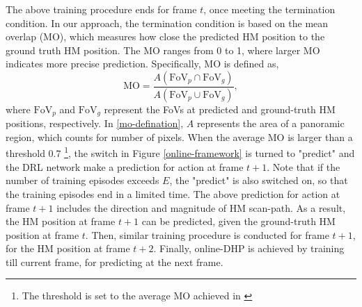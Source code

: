 \documentclass[10pt,journal,compsoc]{IEEEtran}
\begin{document}
The above training procedure ends for frame $t$, once meeting the termination condition.
In our approach, the termination condition is based on the mean overlap (MO), which measures how close the predicted HM position to the ground truth HM position.
The MO ranges from 0 to 1, where larger MO indicates more precise prediction.
Specifically, MO is defined as,
\begin{equation}
\label{mo-defination}
\textrm{MO} =\frac{A(\textrm{FoV}_{p} \cap \textrm{FoV}_{g})}{A(\textrm{FoV}_{p} \cup \textrm{FoV}_{g})},
\end{equation}
where $\textrm{FoV}_{p}$ and $\textrm{FoV}_{g}$ represent the FoVs at predicted and ground-truth HM positions, respectively.
In \eqref{mo-defination}, $A$ represents the area of a panoramic region, which counts for number of pixels.
When the average MO is larger than a threshold $0.7$ \footnote{The threshold is set to the average MO achieved in \cite{hu2017deep}}, the switch in Figure \ref{online-framework} is turned to "predict" and the DRL network make a prediction for action at frame $t+1$.
Note that if the number of training episodes exceeds $E$, the "predict" is also switched on, so that the training episodes end in a limited time.
The above prediction for action at frame $t+1$ includes the direction and magnitude of HM scan-path.
As a result, the HM position at frame $t+1$ can be predicted, given the ground-truth HM position at frame $t$.
Then, similar training procedure is conducted for frame $t+1$, for the HM position at frame $t+2$.
Finally, online-DHP is achieved by training till current frame, for predicting at the next frame.
\end{document}
